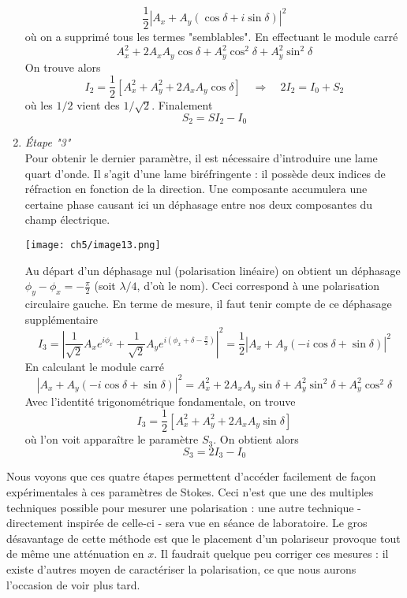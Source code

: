 \begin{enumerate}
\begin{equation}
	\frac{1}{2}|A_x + A_y(\cos\delta +i\sin\delta)|^2
	\end{equation}
	où on a supprimé tous les termes "semblables". En effectuant le module carré
	\begin{equation}
	A_x^2+2A_xA_y\cos\delta + A_y^2\cos^2\delta + A_y^2\sin^2\delta  
	\end{equation}
	On trouve alors
	\begin{equation}
	I_2 = \frac{1}{2}\left[A_x^2+A_y^2+2A_xA_y\cos\delta\right]\quad \Rightarrow\quad 2I_2 = 
	I_0+S_2
	\end{equation}
	où les $1/2$ vient des $1/\sqrt{2}$. Finalement
	\begin{equation}
	S_2 = SI_2 - I_0
	\end{equation}
	\item \textit{Étape "3"}\\
	Pour obtenir le dernier paramètre, il est nécessaire d'introduire une lame quart d'onde. Il 
	s'agit d'une lame biréfringente : il possède deux indices de réfraction en fonction de la 
	direction. Une composante accumulera une certaine phase causant ici un déphasage entre nos 
	deux composantes du champ électrique. 
	\begin{center}
	\texttt{[image: ch5/image13.png]}
	\end{center}	
	Au départ d'un déphasage nul (polarisation linéaire) 
	on obtient  un déphasage $\phi_y-\phi_x=-\frac{\pi}{2}$ (soit $\lambda/4$, d'où le nom).  
	Ceci correspond à une polarisation circulaire gauche. En terme de mesure, il faut tenir 
	compte de ce déphasage supplémentaire
	\begin{equation}
	I_3 = \left|\dfrac{1}{\sqrt{2}}A_xe^{i\phi_x}+\dfrac{1}{\sqrt{2}}A_ye^{i\left(\phi_x+\delta-
	\frac{\pi}{2}\right)}\right|^2 = \frac{1}{2}|A_x + A_y(-i\cos\delta +\sin\delta)|^2
	\end{equation}
	En calculant le module carré
	\begin{equation}
	|A_x + A_y(-i\cos\delta +\sin\delta)|^2 = A_x^2+2A_xA_y\sin\delta + A_y^2\sin^2\delta +A_y^2
	\cos^2\delta
	\end{equation}
	Avec l'identité trigonométrique fondamentale, on trouve
	\begin{equation}
	I_3 = \frac{1}{2}[A_x^2+A_y^2+2A_xA_y\sin\delta]
	\end{equation}
	où l'on voit apparaître le paramètre $S_3$. On obtient alors
	\begin{equation}
	S_3 = 2I_3-I_0
	\end{equation}
	\end{enumerate}
	Nous voyons que ces quatre étapes permettent d'accéder facilement de façon expérimentales à ces 
	paramètres de Stokes. Ceci n'est que une des multiples techniques possible pour mesurer une 
	polarisation : une autre technique - directement inspirée de celle-ci - sera vue en séance de 
	laboratoire. Le gros désavantage de cette méthode est que le placement d'un polariseur provoque 
	tout de même une atténuation en $x$. Il faudrait quelque peu corriger ces mesures : il existe 
	d'autres moyen de caractériser la polarisation, ce que nous aurons l'occasion de voir plus tard.
	
